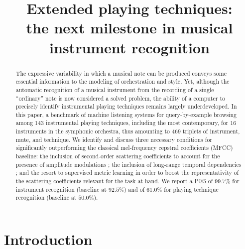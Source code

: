 \documentclass{article}
\title{Extended playing techniques: \\
the next milestone in musical instrument recognition}
\begin{document}
%
\maketitle


\begin{abstract}
The expressive variability in which a musical note can be produced conveys some essential information to the modeling of orchestration and style. Yet, although the automatic recognition of a musical instrument from the recording of a single ``ordinary'' note is now considered a solved problem, the ability of a computer to precisely identify instrumental playing techniques remains largely underdeveloped.
In this paper, a benchmark of machine listening systems for query-by-example browsing among 143 instrumental playing techniques, including the most contemporary, for 16 instruments in the symphonic orchestra, thus amounting to 469 triplets of instrument, mute, and technique. We identify and discuss three necessary conditions for significantly outperforming the classical mel-frequency cepstral coefficients (MFCC) baseline: the inclusion of second-order scattering coefficients to account for the presence of amplitude modulations ; the inclusion of long-range temporal dependencies ; and the resort to supervised metric learning in order to boost the representativity of the scattering coefficients relevant for the task at hand.
We report a P@5 of $99.7\%$ for instrument recognition (baseline at $92.5\%$) and of $61.0\%$ for playing technique recognition (baseline at $50.0\%$).

\end{abstract}



\section{Introduction}\label{sec:introduction}
\end{document}
